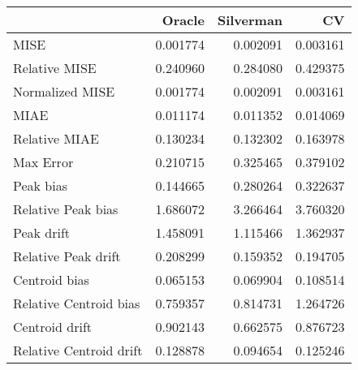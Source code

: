 \begin{tabular}{lrrr}
  \hline
 & Oracle & Silverman & CV \\ 
  \hline
MISE & 0.001774 & 0.002091 & 0.003161 \\ 
  Relative MISE & 0.240960 & 0.284080 & 0.429375 \\ 
  Normalized MISE & 0.001774 & 0.002091 & 0.003161 \\ 
  MIAE & 0.011174 & 0.011352 & 0.014069 \\ 
  Relative MIAE & 0.130234 & 0.132302 & 0.163978 \\ 
  Max Error & 0.210715 & 0.325465 & 0.379102 \\ 
  Peak bias & 0.144665 & 0.280264 & 0.322637 \\ 
  Relative Peak bias & 1.686072 & 3.266464 & 3.760320 \\ 
  Peak drift & 1.458091 & 1.115466 & 1.362937 \\ 
  Relative Peak drift & 0.208299 & 0.159352 & 0.194705 \\ 
  Centroid bias & 0.065153 & 0.069904 & 0.108514 \\ 
  Relative Centroid bias & 0.759357 & 0.814731 & 1.264726 \\ 
  Centroid drift & 0.902143 & 0.662575 & 0.876723 \\ 
  Relative Centroid drift & 0.128878 & 0.094654 & 0.125246 \\ 
   \hline
\end{tabular}
